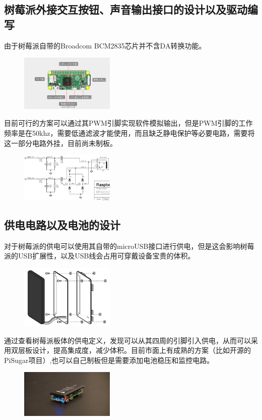 \documentclass[twocolumn,a4,UTF8]{ctexart}
\begin{document}
	\subsection{树莓派外接交互按钮、声音输出接口的设计以及驱动编写}
		由于树莓派自带的Broadcom BCM2835芯片并不含DA转换功能。
		\begin{figure}[H] 
	\centering 
	\includegraphics[width=0.4\textwidth]{zero.png} 
	\end{figure}
		目前可行的方案可以通过其PWM引脚实现软件模拟输出，但是PWM引脚的工作频率是在50khz，需要低通滤波才能使用，而且缺乏静电保护等必要电路，需要将这一部分电路外挂，目前尚未制板。
			\begin{figure}[H] 
	\centering 
	\includegraphics[width=0.4\textwidth]{dianlu.png} 
	\end{figure}
	\subsection{供电电路以及电池的设计}
	对于树莓派的供电可以使用其自带的microUSB接口进行供电，但是这会影响树莓派的USB扩展性，以及USB线会占用可穿戴设备宝贵的体积。
	\begin{figure}[H] 
	\centering 
	\includegraphics[width=0.4\textwidth]{ins.png} 
	\end{figure}
	通过查看树莓派板体的供电定义，发现可以从其四周的引脚引入供电，从而可以采用双层板设计，提高集成度，减少体积。目前市面上有成熟的方案（比如开源的
PiSugar项目）,也可以自己制板但是需要添加电池稳压和监控电路。
			\begin{figure}[H] 
	\centering 
	\includegraphics[width=0.4\textwidth]{demo2.png} 
	\end{figure}
 		
  
\end{document}
